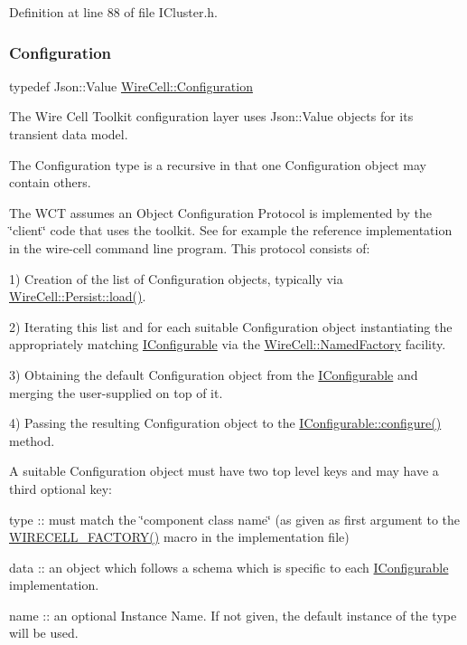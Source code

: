 Definition at line 88 of file I\+Cluster.\+h.

\mbox{\label{namespace_wire_cell_a9f705541fc1d46c608b3d32c182333ee}} 
\subsubsection{\texorpdfstring{Configuration}{Configuration}}
{\footnotesize\ttfamily typedef Json\+::\+Value \hyperlink{namespace_wire_cell_a9f705541fc1d46c608b3d32c182333ee}{Wire\+Cell\+::\+Configuration}}

The Wire Cell Toolkit configuration layer uses Json\+::\+Value objects for its transient data model.

The Configuration type is a recursive in that one Configuration object may contain others.

The W\+CT assumes an Object Configuration Protocol is implemented by the \char`\"{}client\char`\"{} code that uses the toolkit. See for example the reference implementation in the wire-\/cell command line program. This protocol consists of\+:

1) Creation of the list of Configuration objects, typically via \hyperlink{namespace_wire_cell_1_1_persist_ab922ff3e9c80bcbc9d4e8342f7d3223d}{Wire\+Cell\+::\+Persist\+::load()}.

2) Iterating this list and for each suitable Configuration object instantiating the appropriately matching \hyperlink{class_wire_cell_1_1_i_configurable}{I\+Configurable} via the \hyperlink{class_wire_cell_1_1_named_factory}{Wire\+Cell\+::\+Named\+Factory} facility.

3) Obtaining the default Configuration object from the \hyperlink{class_wire_cell_1_1_i_configurable}{I\+Configurable} and merging the user-\/supplied on top of it.

4) Passing the resulting Configuration object to the \hyperlink{class_wire_cell_1_1_i_configurable_a57ff687923a724093df3de59c6ff237d}{I\+Configurable\+::configure()} method.

A suitable Configuration object must have two top level keys and may have a third optional key\+:


\begin{DoxyItemize}
\item type \+:\+: must match the \char`\"{}component class name\char`\"{} (as given as first argument to the \hyperlink{_named_factory_8h_ab4f04b9d9f83474657edd6d317696b9a}{W\+I\+R\+E\+C\+E\+L\+L\+\_\+\+F\+A\+C\+T\+O\+R\+Y()} macro in the implementation file)
\item data \+:\+: an object which follows a schema which is specific to each \hyperlink{class_wire_cell_1_1_i_configurable}{I\+Configurable} implementation.
\item name \+:\+: an optional Instance Name. If not given, the default instance of the type will be used. 
\end{DoxyItemize}

